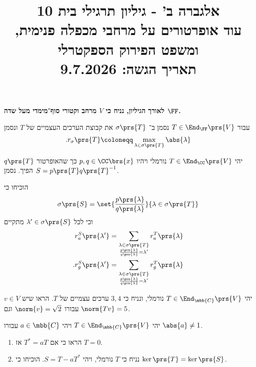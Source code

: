 \documentclass[a4paper,10pt,twoside,openany]{article}
\title{
אלגברה ב' - גיליון תרגילי בית 10 \\
עוד אופרטורים על מרחבי מכפלה פנימית, ומשפט הפירוק הספקטרלי
\\
\vspace{1cm}
\large{תאריך הגשה: 9.7.2026}
}
\date{}
\begin{document}
\maketitle

\textbf{לאורך הגיליון, נניח כי
$V$
מרחב וקטורי סוף־מימדי מעל שדה
$\FF$.}

\begin{notation}
עבור
$T \in \End_\FF\prs{V}$
נסמן ב־%
$\sigma\prs{T}$
את קבוצת הערכים העצמיים של
$T$
ונסמן
\begin{align*}
\text{.} r_\sigma\prs{T} \coloneqq \max_{\lambda \in \sigma\prs{T}} \abs{\lambda}
\end{align*}
\end{notation}

\begin{exercise}
יהי
$T \in \End_\CC\prs{V}$
נורמלי
ויהיו
$p,q \in \CC\brs{x}$
כך שהאופרטור
$q\prs{T}$
הפיך.
נסמן
$S = p\prs{T} q\prs{T}^{-1}$.

הוכיחו כי
\begin{align*}
\sigma\prs{S} = \set{\frac{p\prs{\lambda}}{q\prs{\lambda}}}{\lambda \in \sigma\prs{T}}
\end{align*}
וכי לכל
$\lambda' \in \sigma\prs{S}$
מתקיים
\begin{align*}
r^S_a\prs{\lambda'} = \sum_{\substack{\lambda \in \sigma\prs{T} \\ \frac{p\prs{\lambda}}{q\prs{\lambda}} = \lambda'}} r_a^T\prs{\lambda} \\
\text{.} r^S_g\prs{\lambda'} = \sum_{\substack{\lambda \in \sigma\prs{T} \\ \frac{p\prs{\lambda}}{q\prs{\lambda}} = \lambda'}} r_g^T\prs{\lambda}
\end{align*}
\end{exercise}

\begin{exercise}
יהי
$T \in \End_{\mbb{C}}\prs{V}$
נורמלי, ונניח כי
$3,4$
ערכים עצמיים של
$T$.
הראו שיש
$v \in V$
עבורו
$\norm{v} = \sqrt{2}$
וגם
$\norm{Tv} = 5$.
\end{exercise}

\begin{exercise}
יהי
$T \in \End_{\mbb{C}}\prs{V}$
ויהי
$a \in \mbb{C}$
עבורו
$\abs{a} \neq 1$.

\begin{enumerate}
\item הראו כי אם
$T^* = aT$
אז
$T = 0$.

\item נניח כי
$T$
נורמלי, ויהי
$S = T - a T^*$.
הוכיחו כי
$\ker\prs{T} = \ker\prs{S}$.
\end{enumerate}
\end{exercise}
\end{document}
